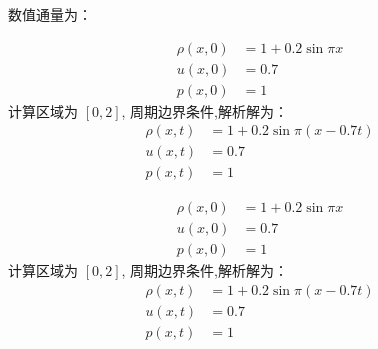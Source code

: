 \documentclass{book}
\begin{document}
数值通量为：

\begin{example}
    \begin{equation}
        \begin{aligned}
            \rho(x, 0) & =1+0.2 \sin \pi x \\
            u(x, 0)    & =0.7              \\
            p(x, 0)    & =1
        \end{aligned}
    \end{equation}
    计算区域为 $[0,2]$, 周期边界条件,解析解为：
    \begin{equation}
        \begin{aligned}
            \rho(x, t) & =1+0.2 \sin \pi(x-0.7 t) \\
            u(x, t)    & =0.7                     \\
            p(x, t)    & =1
        \end{aligned}
    \end{equation}
\end{example}


\begin{example}{}{}
    \begin{equation}
        \begin{aligned}
            \rho(x, 0) & =1+0.2 \sin \pi x \\
            u(x, 0)    & =0.7              \\
            p(x, 0)    & =1
        \end{aligned}
    \end{equation}
    计算区域为 $[0,2]$, 周期边界条件,解析解为：
    \begin{equation}
        \begin{aligned}
            \rho(x, t) & =1+0.2 \sin \pi(x-0.7 t) \\
            u(x, t)    & =0.7                     \\
            p(x, t)    & =1
        \end{aligned}
    \end{equation}
\end{example}
\end{document}
